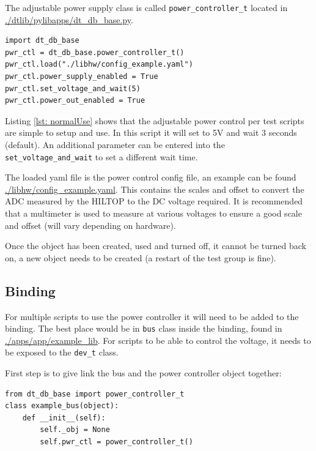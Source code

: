\documentclass[a4paper,12pt, notitlepage]{article}
\begin{document}
The adjustable power supply class is called \lstinline!power_controller_t! located in \url{./dtlib/pylibapps/dt_db_base.py}.

\begin{lstlisting}[label={lst: normalUse}, caption={A normal way of using the power controller object.}]
import dt_db_base
pwr_ctl = dt_db_base.power_controller_t()
pwr_ctl.load("./libhw/config_example.yaml")
pwr_ctl.power_supply_enabled = True
pwr_ctl.set_voltage_and_wait(5)
pwr_ctl.power_out_enabled = True
\end{lstlisting}

Listing \ref{lst: normalUse} shows that the adjustable power control per test scripts are simple to setup and use. In this script it will set to 5V and wait 3 seconds (default). An additional parameter can be entered into the \lstinline!set_voltage_and_wait! to set a different wait time. 

The loaded yaml file is the power control config file, an example can be found \url{./libhw/config_example.yaml}. This contains the scales and offset to convert the ADC measured by the HILTOP to the DC voltage required. It is recommended that a multimeter is used to measure at various voltages to ensure a good scale and offset (will vary depending on hardware). 

Once the object has been created, used and turned off, it cannot be turned back on, a new object needs to be created (a restart of the test group is fine).

\subsection{Binding}
\label{ssec: bindingPwrctl}

For multiple scripts to use the power controller it will need to be added to the binding. The best place would be in \lstinline!bus! class inside the binding, found in \url{./apps/app/example_lib}. For scripts to be able to control the voltage, it needs to be exposed to the \lstinline!dev_t! class.

First step is to give link the bus and the power controller object together:

\begin{lstlisting}[label={lst: adjpwrStruct0},caption={Make an object for the power controller.}]
from dt_db_base import power_controller_t
class example_bus(object):
    def __init__(self):
        self._obj = None
        self.pwr_ctl = power_controller_t()
\end{lstlisting}
\end{document}
